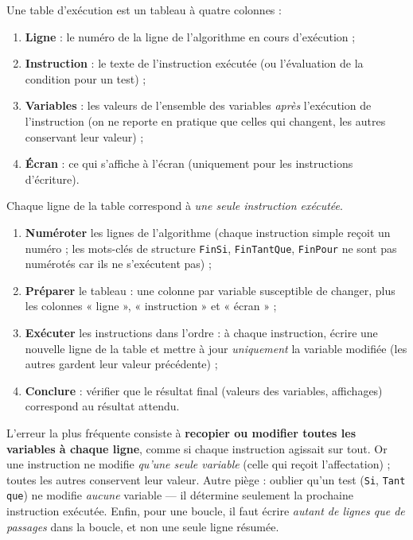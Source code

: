 \documentclass[11pt]{article}
\newcommand{\cle}[1]{{\popxbold\color{popdark}#1}}
\newcounter{popsec}
\newcounter{popsub}
\newcommand{\courssub}[1]{%
  \stepcounter{popsub}%
  \par\vspace{9pt}\noindent{\popxbold\fontsize{11.5}{13}\selectfont\color{popink}{\color{poporange}\thepopsec.\thepopsub}\hspace{6pt}#1}\par\nopagebreak\vspace{4pt}
}
\begin{document}
\courssub{Structure d'une table d'exécution}

\begin{definition}
Une \cle{table d'exécution} est un tableau à quatre colonnes :
\begin{enumerate}
\item \textbf{Ligne} : le numéro de la ligne de l'algorithme en cours d'exécution ;
\item \textbf{Instruction} : le texte de l'instruction exécutée (ou l'évaluation de la condition pour un test) ;
\item \textbf{Variables} : les valeurs de l'ensemble des variables \emph{après} l'exécution de l'instruction (on ne reporte en pratique que celles qui changent, les autres conservant leur valeur) ;
\item \textbf{Écran} : ce qui s'affiche à l'écran (uniquement pour les instructions d'écriture).
\end{enumerate}
Chaque ligne de la table correspond à \emph{une seule instruction exécutée}.
\end{definition}

\begin{methode}
\begin{enumerate}
\item \textbf{Numéroter} les lignes de l'algorithme (chaque instruction simple reçoit un numéro ; les mots-clés de structure \texttt{FinSi}, \texttt{FinTantQue}, \texttt{FinPour} ne sont pas numérotés car ils ne s'exécutent pas) ;
\item \textbf{Préparer} le tableau : une colonne par variable susceptible de changer, plus les colonnes « ligne », « instruction » et « écran » ;
\item \textbf{Exécuter} les instructions dans l'ordre : à chaque instruction, écrire une nouvelle ligne de la table et mettre à jour \emph{uniquement} la variable modifiée (les autres gardent leur valeur précédente) ;
\item \textbf{Conclure} : vérifier que le résultat final (valeurs des variables, affichages) correspond au résultat attendu.
\end{enumerate}
\end{methode}

\begin{attention}
L'erreur la plus fréquente consiste à \textbf{recopier ou modifier toutes les variables à chaque ligne}, comme si chaque instruction agissait sur tout. Or une instruction ne modifie \emph{qu'une seule variable} (celle qui reçoit l'affectation) ; toutes les autres conservent leur valeur. Autre piège : oublier qu'un test (\texttt{Si}, \texttt{Tant que}) ne modifie \emph{aucune} variable — il détermine seulement la prochaine instruction exécutée. Enfin, pour une boucle, il faut écrire \emph{autant de lignes que de passages} dans la boucle, et non une seule ligne résumée.
\end{attention}
\end{document}
